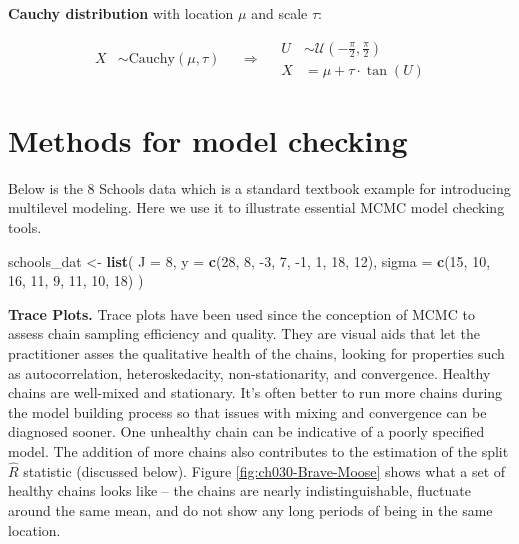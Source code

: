\documentclass[11pt, oneside, openany]{scrbook}
\newenvironment{Shaded}{\begin{snugshade}}{\end{snugshade}}
\newcommand{\DataTypeTok}[1]{\textcolor[rgb]{0.13,0.29,0.53}{#1}}
\newcommand{\DecValTok}[1]{\textcolor[rgb]{0.00,0.00,0.81}{#1}}
\newcommand{\KeywordTok}[1]{\textcolor[rgb]{0.13,0.29,0.53}{\textbf{#1}}}
\newcommand{\NormalTok}[1]{#1}
\newcommand{\StringTok}[1]{\textcolor[rgb]{0.31,0.60,0.02}{#1}}
\begin{document}
\textbf{Cauchy distribution} with location \(\mu\) and scale \(\tau\):


\begin{equation}
  \begin{split}
    X &\sim \mathrm{Cauchy}(\mu, \tau)
  \end{split}
\quad \Longrightarrow \quad
  \begin{split}
    U &\sim \mathcal{U}\left(-\frac{\pi}{2}, \frac{\pi}{2}\right) \\
    X &= \mu + \tau \cdot \tan(U)
  \end{split}
\label{eq:nc-cauchy}
\end{equation}

\hypertarget{model-checking}{%
\section{Methods for model checking}\label{model-checking}}

Below is the 8 Schools data \citep{gelman2013bayesian} which is a standard textbook example for introducing multilevel modeling. Here we use it to illustrate essential MCMC model checking tools.

\begin{Shaded}
\begin{Highlighting}[]
\NormalTok{schools_dat <-}\StringTok{ }\KeywordTok{list}\NormalTok{(}
  \DataTypeTok{J =} \DecValTok{8}\NormalTok{,}
  \DataTypeTok{y =} \KeywordTok{c}\NormalTok{(}\DecValTok{28}\NormalTok{,  }\DecValTok{8}\NormalTok{, }\DecValTok{-3}\NormalTok{,  }\DecValTok{7}\NormalTok{, }\DecValTok{-1}\NormalTok{,  }\DecValTok{1}\NormalTok{, }\DecValTok{18}\NormalTok{, }\DecValTok{12}\NormalTok{),}
  \DataTypeTok{sigma =} \KeywordTok{c}\NormalTok{(}\DecValTok{15}\NormalTok{, }\DecValTok{10}\NormalTok{, }\DecValTok{16}\NormalTok{, }\DecValTok{11}\NormalTok{,  }\DecValTok{9}\NormalTok{, }\DecValTok{11}\NormalTok{, }\DecValTok{10}\NormalTok{, }\DecValTok{18}\NormalTok{)}
\NormalTok{)}
\end{Highlighting}
\end{Shaded}

\textbf{Trace Plots.} Trace plots have been used since the conception of MCMC to assess chain sampling efficiency and quality. They are visual aids that let the practitioner asses the qualitative health of the chains, looking for properties such as autocorrelation, heteroskedacity, non-stationarity, and convergence. Healthy chains are well-mixed and stationary. It's often better to run more chains during the model building process so that issues with mixing and convergence can be diagnosed sooner. One unhealthy chain can be indicative of a poorly specified model. The addition of more chains also contributes to the estimation of the split \(\hat{R}\) statistic (discussed below). Figure \ref{fig:ch030-Brave-Moose} shows what a set of healthy chains looks like -- the chains are nearly indistinguishable, fluctuate around the same mean, and do not show any long periods of being in the same location.
\end{document}

